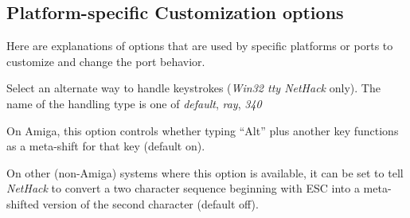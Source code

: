 \subsection*{Platform-specific Customization options}

Here are explanations of options that are used by specific platforms
or ports to customize and change the port behavior.

\blist{}
\item[\ib{altkeyhandling}]
Select an alternate way to handle keystrokes ({\it Win32 tty\/ NetHack\/} only).
The name of the handling type is one of {\it default}, {\it ray}, {\it 340}
\item[\ib{altmeta}]
On Amiga, this option controls whether typing ``Alt'' plus another key
functions as a meta-shift for that key (default on).
\item[\ib{altmeta}]
On other (non-Amiga) systems where this option is available, it can be
set to tell {\it NetHack\/} to convert a two character sequence beginning with
ESC into a meta-shifted version of the second character (default off).

